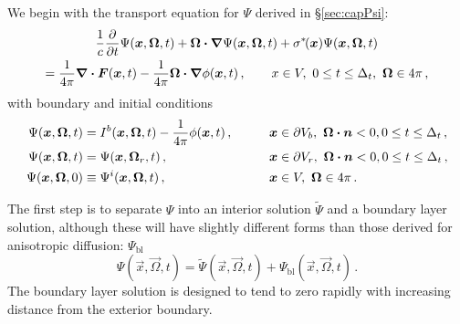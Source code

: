 We begin with the transport equation for $\Psi$ derived in \S\ref{sec:capPsi}:
\begin{multline*}
  \frac{1}{c} \frac{\partial }{\partial t}\Psi(\bm{x}, \bm{\Omega}, t)
    + \bm{\Omega}\bm{\cdot} \bm{\nabla} \Psi(\bm{x}, \bm{\Omega}, t)
    + \sigma^{*\!}(\bm{x}) \Psi(\bm{x}, \bm{\Omega}, t)
    \\
  = \frac{1}{4\pi} \bm{\nabla} \bm{\cdot}\bm{F}(\bm{x}, t) -
  \frac{1}{4\pi} \bm{\Omega}\bm{\cdot} \bm{\nabla} \phi(\bm{x}, t)\,,
\qquad x \in V,\  0 \le t \le \Delta_t, \ \bm{\Omega} \in 4\pi\,,
\end{multline*}
with boundary and initial conditions
\begin{alignat*}{2}
  \Psi(\bm{x}, \bm{\Omega}, t) 
  &=I^b(\bm{x}, \bm{\Omega}, t) - \frac{1}{4\pi} \phi(\bm{x}, t)\,,
  &\qquad&
  \bm{x} \in \partial V_b, \ \bm{\Omega} \bm{\cdot} \bm{n} < 0,
 0 \le t \le \Delta_t\,,
 \\
  \Psi(\bm{x}, \bm{\Omega}, t) 
  &= \Psi(\bm{x}, \bm{\Omega}_r, t)\,,
  &&
  \bm{x} \in \partial V_r, \ \bm{\Omega} \bm{\cdot} \bm{n} < 0,
 0 \le t \le \Delta_t\,,
  \\
  \Psi(\bm{x}, \bm{\Omega}, 0)
  &\equiv \Psi^i(\bm{x}, \bm{\Omega}, t)\,,
  && 
  \bm{x} \in V, \ \bm{\Omega} \in 4\pi\,.
\end{alignat*}

The first step is to separate $\Psi$ into an interior solution $\tilde\Psi$ and
a boundary layer solution, although these will have slightly different forms
than those derived for anisotropic diffusion:
$\Psi_\mathrm{bl}$
\begin{equation} \label{eq:ap1boundaryLayerPsi}
  \Psi(\vec{x}, \vec{\Omega}, t)
  = \tilde\Psi(\vec{x}, \vec{\Omega}, t)
  + \Psi_\mathrm{bl}(\vec{x}, \vec{\Omega}, t)\,.
\end{equation}
The boundary layer solution is designed to tend to zero rapidly with increasing
distance from the exterior boundary.

